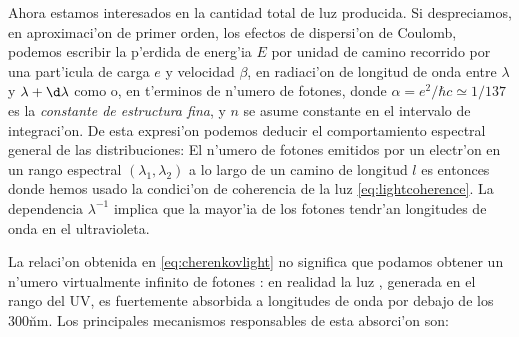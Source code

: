 Ahora estamos interesados en la cantidad total de luz producida. Si
despreciamos, en aproximaci'on de primer orden, los efectos de
dispersi'on de Coulomb, podemos escribir la p'erdida de energ'ia $E$
por unidad de camino recorrido por una part'icula de carga $e$ y
velocidad $\beta$, en radiaci'on \Cerenkov de longitud de onda entre
$\lambda$ y $\lambda+\d \lambda$ como
%
\dEdheq
%
o, en t'erminos de n'umero de fotones,
%
\dNdheq
%
donde $\alpha = e^2/\hbar c \simeq 1/137$ es la \emph{constante de
estructura fina}, y $n$ se asume constante en el intervalo de
integraci'on. De esta expresi'on podemos deducir el comportamiento
espectral general de las distribuciones:
%
\specdistreq
%
El n'umero de fotones emitidos por un electr'on en un rango espectral
$(\lambda_1,\lambda_2)$ a lo largo de un camino de longitud $l$ es
entonces
%
\phemiteq
%
donde hemos usado la condici'on de coherencia de la luz \Cerenkov
\ref{eq:lightcoherence}. La dependencia $\lambda^{-1}$ implica que la
mayor'ia de los fotones tendr'an longitudes de onda en el
ultravioleta.

La relaci'on obtenida en \ref{eq:cherenkovlight} no significa que
podamos obtener un n'umero virtualmente infinito de fotones
\Cherenkov: en realidad la luz \Cerenkov, generada en el rango del UV, 
es fuertemente absorbida a longitudes de onda por debajo de los
300\u{nm}. Los principales mecanismos responsables de esta absorci'on
son:


